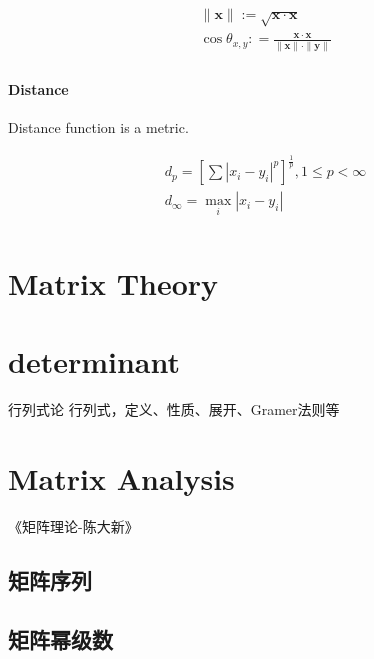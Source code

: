 \documentclass[UTF8]{../../09-Mathematics}
\begin{document}
\begin{equation}
    \begin{split}
    &\parallel \boldsymbol{x} \parallel := \sqrt{\boldsymbol x \cdot \boldsymbol x}\\
    &\cos {\theta_{x,y}} : = \frac
    {\boldsymbol x \cdot \boldsymbol x}
    {\parallel \boldsymbol{x} \parallel \cdot \parallel \boldsymbol{y} \parallel}\\
\end{split}
\end{equation}


\subsubsection{Distance}

Distance function is a metric.


\begin{equation}
    \begin{split}
    &d_p = [\sum |x_i-y_i|^p]^{\frac{1}{p}}, 1\leqslant p < \infty\\
    & d_{\infty} = \max_i|x_i-y_i|\\
\end{split}
\end{equation}


\chapter{Matrix Theory} %



\chapter{determinant}

行列式论
行列式，定义、性质、展开、Gramer法则等








\chapter{Matrix Analysis}
《矩阵理论-陈大新》

\section{矩阵序列}
\section{矩阵幂级数}
\end{document}
